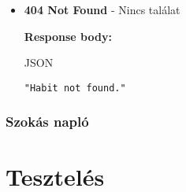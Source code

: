 \documentclass[12pt]{report}
\begin{document}
\begin{description}
\begin{itemize}
      \item \textbf{404 Not Found} - Nincs találat

        \textbf{Response body:}
        \begin{codeblock}{JSON}
          \begin{verbatim}
"Habit not found."
          \end{verbatim}
        \end{codeblock}
    \end{itemize}
\end{description}

\subsection{Szokás napló}
\begin{description}
  \item[] 
\end{description}

\chapter{Tesztelés}
\end{document}
